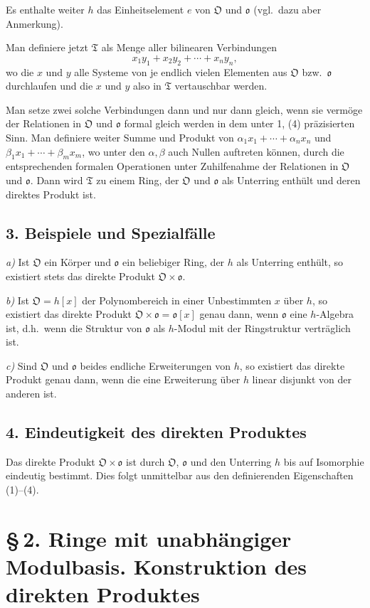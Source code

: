 \documentclass[10pt,a4paper]{article}
\theoremstyle{plain}
\theoremstyle{definition}
\theoremstyle{remark}
\newcommand{\ido}{\mathfrak{o}}
\newcommand{\cO}{\mathfrak{O}}
\begin{document}
Es enthalte weiter $h$ das Einheitselement $e$ von $\cO$ und $\ido$ (vgl.\ dazu aber Anmerkung).

Man definiere jetzt $\mathfrak{T}$ als Menge aller bilinearen Verbindungen
\[
x_1 y_1 + x_2 y_2 + \cdots + x_n y_n,
\]
wo die $x$ und $y$ alle Systeme von je endlich vielen Elementen aus $\cO$ bzw.\ $\ido$ durchlaufen und die $x$ und $y$ also in $\mathfrak{T}$ vertauschbar werden.

Man setze zwei solche Verbindungen dann und nur dann gleich, wenn sie verm\"oge der Relationen in $\cO$ und $\ido$ formal gleich werden in dem unter 1, (4) pr\"azisierten Sinn. Man definiere weiter Summe und Produkt von $\alpha_1 x_1 + \cdots + \alpha_n x_n$ und $\beta_1 x_1 + \cdots + \beta_m x_m$, wo unter den $\alpha, \beta$ auch Nullen auftreten k\"onnen, durch die entsprechenden formalen Operationen unter Zuhilfenahme der Relationen in $\cO$ und $\ido$. Dann wird $\mathfrak{T}$ zu einem Ring, der $\cO$ und $\ido$ als Unterring enth\"ult und deren direktes Produkt ist.

\subsection*{3. Beispiele und Spezialf\"alle}

\textit{a)} Ist $\cO$ ein K\"orper und $\ido$ ein beliebiger Ring, der $h$ als Unterring enth\"ult, so existiert stets das direkte Produkt $\cO \times \ido$.

\textit{b)} Ist $\cO = h[x]$ der Polynombereich in einer Unbestimmten $x$ \"uber $h$, so existiert das direkte Produkt $\cO \times \ido = \ido[x]$ genau dann, wenn $\ido$ eine $h$-Algebra ist, d.h.\ wenn die Struktur von $\ido$ als $h$-Modul mit der Ringstruktur vertr\"aglich ist.

\textit{c)} Sind $\cO$ und $\ido$ beides endliche Erweiterungen von $h$, so existiert das direkte Produkt genau dann, wenn die eine Erweiterung \"uber $h$ linear disjunkt von der anderen ist.

\subsection*{4. Eindeutigkeit des direkten Produktes}

Das direkte Produkt $\cO \times \ido$ ist durch $\cO$, $\ido$ und den Unterring $h$ bis auf Isomorphie eindeutig bestimmt. Dies folgt unmittelbar aus den definierenden Eigenschaften (1)--(4).

\newpage
\section*{\S\,2. Ringe mit unabh\"angiger Modulbasis. Konstruktion des direkten Produktes}
\end{document}
